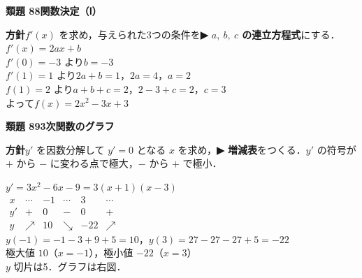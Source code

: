 \documentclass[a4paper,11pt]{ltjsarticle}
\newcommand{\ans}[2]{\Needspace{5\baselineskip}\vspace{6pt}%
  {\sffamily\bfseries 類題 #1\quad #2}\par}
\newcommand{\point}[1]{\textsf{\bfseries ▶ #1}}
\begin{document}
\ans{88}{関数決定（Ⅰ）}
\begin{kai}
\textbf{方針}\quad $f'(x)$ を求め，与えられた3つの条件を\point{$a,\ b,\ c$ の連立方程式}にする．\\[2pt]
$f'(x)=2ax+b$\\
$f'(0)=-3$ より\quad $b=-3$\\
$f'(1)=1$ より\quad $2a+b=1$，\quad $2a=4$，\quad $a=2$\\
$f(1)=2$ より\quad $a+b+c=2$，\quad $2-3+c=2$，\quad $c=3$\\[2pt]
よって\quad $f(x)=2x^2-3x+3$
\end{kai}

\ans{89}{3次関数のグラフ}
\begin{kai}
\textbf{方針}\quad $y'$ を因数分解して $y'=0$ となる $x$ を求め，\point{増減表}をつくる．$y'$ の符号が $+$ から $-$ に変わる点で極大，$-$ から $+$ で極小．\\[2pt]
\begin{minipage}[t]{0.58\linewidth}
$y'=3x^2-6x-9=3(x+1)(x-3)$\\[2pt]
\renewcommand{\arraystretch}{1.1}
$\begin{array}{c|ccccc}
x&\cdots&-1&\cdots&3&\cdots\\ \hline
y'&+&0&-&0&+\\ \hline
y&\nearrow&10&\searrow&-22&\nearrow
\end{array}$\\[4pt]
$y(-1)=-1-3+9+5=10$，\quad $y(3)=27-27-27+5=-22$\\
極大値 $10$（$x=-1$），\quad 極小値 $-22$（$x=3$）\\
$y$ 切片は5．グラフは右図．
\end{minipage}\hfill
\begin{minipage}[t]{0.38\linewidth}
\vspace{-6pt}
\end{minipage}
\end{kai}
\end{document}
